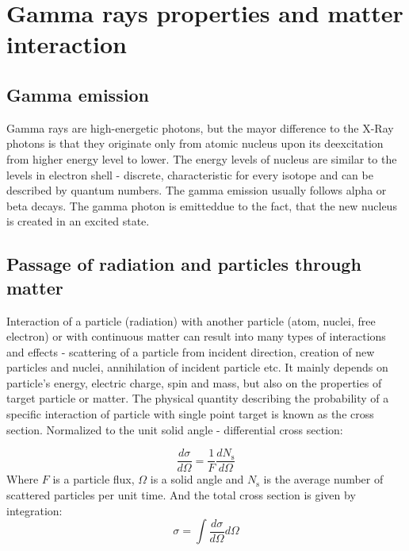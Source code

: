 
\chapter{Gamma rays properties and matter interaction}
\label{gammas}

\section{Gamma emission}
Gamma rays are high-energetic photons, but the mayor difference to the X-Ray photons is that they originate only from atomic nucleus upon its deexcitation from higher energy level to lower. The energy levels of nucleus are similar to the levels in electron shell - discrete, characteristic for every isotope and can be described by quantum numbers. The gamma emission usually follows alpha or beta decays. The gamma photon is emitteddue to the fact, that the new nucleus is created in an excited state.


\section{Passage of radiation and particles through matter}
Interaction of a particle (radiation) with another particle (atom, nuclei, free electron) or with continuous matter can result into many types of interactions and effects - scattering of a particle from incident direction, creation of new particles and nuclei, annihilation of incident particle etc. It mainly depends on particle's energy, electric charge, spin and mass, but also on the properties of target particle or matter. The physical quantity describing the probability of a specific interaction of particle with single point target is known as the cross section. Normalized to the unit solid angle - differential cross section:



 \begin{equation}
\frac{d\sigma}{d\Omega} = \frac{1}{F} \frac{dN_\textrm{s}}{d\Omega}
 \end{equation}
Where $F$ is a particle flux, $\Omega$ is a solid angle and $N_\textrm{s}$ is the average number of scattered particles per unit time.
And the total cross section is given by integration:
  \begin{equation}
 \sigma = \int \frac{d\sigma}{d\Omega} d\Omega
 \end{equation}

